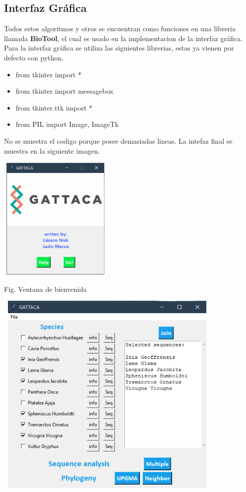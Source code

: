 \documentclass[a4paper]{article}
\begin{document}
\subsection{Interfaz Gráfica}
\noindent Todos estos algoritmos y otros se encuentran como funciones en una libreria llamada \textbf{BioTool}, el cual es usado en la implementacion de la interfaz gráfica.
Para la interfaz gráfica se utiliza las siguientes librerias, estas ya vienen por defecto con python.
\begin{itemize}

\item from tkinter import *
\item from tkinter import messagebox
\item from tkinter.ttk import *
\item from PIL import Image, ImageTk

\end{itemize}
No se muestra el codigo porque posee demasiadas lineas. La intefaz final se muestra en la siguiente imagen.

\begin{center}
	\includegraphics[width=5.5cm,height=6cm]{bienvenida.png}
	
	Fig. Ventana de bienvenida
	
\end{center}

\begin{center}
	\includegraphics[width=11cm,height=10cm]{InterfazFinal.png}
\end{center}
\end{document}
